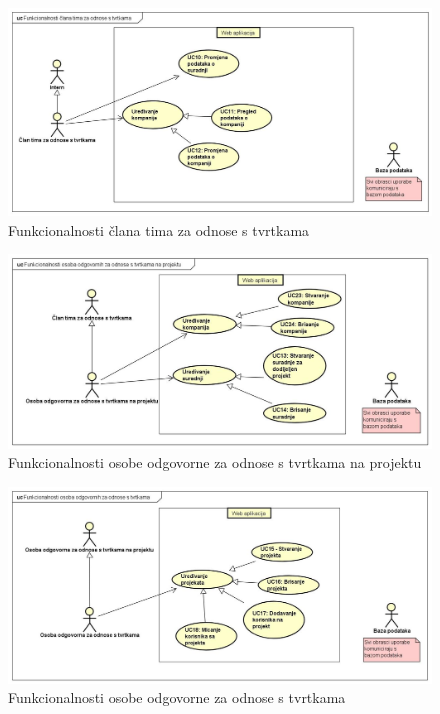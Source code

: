					\begin{figure}[H]
						\includegraphics[scale=0.3]{slike/UC dijagrami/UseCase FR team member}
						\centering
						\caption{Funkcionalnosti člana tima za odnose s tvrtkama}
						\label{fig:frTeamMember}
					\end{figure}

					\begin{figure}[H]
						\includegraphics[scale=0.3]{slike/UC dijagrami/UseCase FR responsible}
						\centering
						\caption{Funkcionalnosti osobe odgovorne za odnose s tvrtkama na projektu}
						\label{fig:frResponsible}
					\end{figure}

					\begin{figure}[H]
						\includegraphics[scale=0.3]{slike/UC dijagrami/UseCase moderator}
						\centering
						\caption{Funkcionalnosti osobe odgovorne za odnose s tvrtkama}
						\label{fig:frModerator}
					\end{figure}

